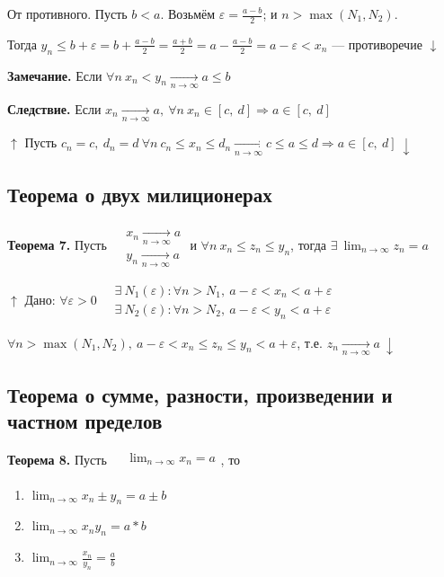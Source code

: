 \documentclass{article}
\begin{document}
    От противного. Пусть \(b < a\). Возьмём \(\varepsilon = \frac{a-b}{2}\); и \(n > \max{(N_1, N_2)}\).
    
    Тогда \(y_n \leq b + \varepsilon = b + \frac{a-b}{2} = \frac{a + b}{2} = a - \frac{a-b}{2} = a - \varepsilon < x_n\) --- противоречие \(\downarrow\)
    
    \textbf{Замечание.} Если \(\forall n\ x_n < y_n \xrightarrow[n \rightarrow \infty]{} a \leq b\)
  
    \textbf{Следствие.} Если \(x_n \xrightarrow[n \rightarrow \infty]{} a,\ \forall n\ x_n \in [c,\ d] \Rightarrow a \in [c,\ d]\)
    
    \(\uparrow\) Пусть \(c_n = c,\ d_n = d\ \forall n\ c_n \leq x_n \leq d_n \xrightarrow[n \rightarrow \infty]{} c \leq a \leq d \Rightarrow a \in [c,\ d]\ \downarrow\)
    
    \subsection{Теорема о двух милиционерах}
    
    \textbf{Теорема 7.} Пусть \(\begin{aligned}
    	&x_n \xrightarrow[n \rightarrow \infty]{} a\\
        &y_n \xrightarrow[n \rightarrow \infty]{} a
        \end{aligned}\) и \(\forall n\ x_n \leq z_n \leq y_n\), тогда \(\exists\ \lim_{n \rightarrow \infty}{z_n} = a\)
        
    \(\uparrow\) Дано: \(\forall \varepsilon > 0\ \begin{aligned}
    	&\exists\ N_1(\varepsilon) : \forall n > N_1,\ a - \varepsilon < x_n < a + \varepsilon\\
        &\exists\ N_2(\varepsilon) : \forall n > N_2,\ a - \varepsilon < y_n < a + \varepsilon
    	\end{aligned}\)
    
    \(\forall n > \max{(N_1, N_2)},\ a - \varepsilon < x_n \leq z_n \leq y_n < a + \varepsilon\), т.е. \(z_n \xrightarrow[n \rightarrow \infty]{} a\ \downarrow\)
    
    \subsection{Теорема о сумме, разности, произведении и частном пределов}
    
    \textbf{Теорема 8.} Пусть \(\begin{aligned}
    	&\lim_{n \rightarrow \infty}{x_n} = a\\
        \end{aligned}\), то
        \begin{enumerate}
        	\item \(\lim_{n \rightarrow \infty}{x_n \pm y_n} = a \pm b\)
            \item \(\lim_{n \rightarrow \infty}{x_n y_n} = a*b\)
            \item \(\lim_{n \rightarrow \infty}{\frac{x_n}{y_n}} = \frac{a}{b}\)
        \end{enumerate}
    
\end{document}

